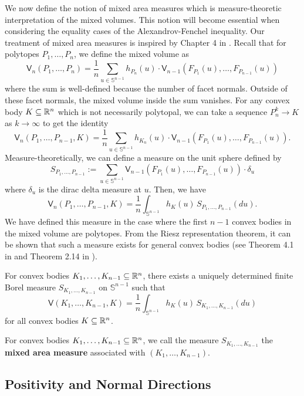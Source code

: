\documentclass{puthesis-UG}
\begin{document}
We now define the notion of mixed area measures which is measure-theoretic interpretation of the mixed volumes. This notion will become essential when considering the equality cases of the Alexandrov-Fenchel inequality. Our treatment of mixed area measures is inspired by Chapter 4 in \cite{Hug2020-ue}. Recall that for polytopes $P_1, \ldots, P_n$, we define the mixed volume as 
\[
	\mathsf{V}_n (P_1, \ldots, P_n) = \frac{1}{n} \sum_{u \in \mathbb{S}^{n-1}} h_{P_n}(u) \cdot \mathsf{V}_{n-1}(F_{P_1}(u), \ldots, F_{P_{n-1}}(u))
\]
where the sum is well-defined because the number of facet normals. Outside of these facet normals, the mixed volume inside the sum vanishes. For any convex body $K \subseteq \mathbb{R}^n$ which is not necessarily polytopal, we can take a sequence $P_n^k \to K$ as $k \to \infty$ to get the identity
\[
	\mathsf{V}_n(P_1, \ldots, P_{n-1}, K) = \frac{1}{n} \sum_{u \in \mathbb{S}^{n-1}} h_{K_n}(u) \cdot \mathsf{V}_{n-1}(F_{P_1}(u), \ldots, F_{P_{n-1}}(u)).
\]
Measure-theoretically, we can define a measure on the unit sphere defined by
\[
	S_{P_1, \ldots, P_{n-1}} := \sum_{u \in \mathbb{S}^{n-1}} \mathsf{V}_{n-1}(F_{P_1}(u), \ldots, F_{P_{n-1}}(u)) \cdot \delta_u
\]
where $\delta_u$ is the dirac delta measure at $u$. Then, we have 
\[
	\mathsf{V}_n(P_1, \ldots, P_{n-1}, K) = \frac{1}{n} \int_{\mathbb{S}^{n-1}} h_{K}(u) \, S_{P_1, \ldots, P_{n-1}}(du).
\]
We have defined this measure in the case where the first $n-1$ convex bodies in the mixed volume are polytopes. From the Riesz representation theorem, it can be shown that such a measure exists for general convex bodies (see Theorem 4.1 in \cite{Hug2020-ue} and Theorem 2.14 in \cite{rudin}).

\begin{thm} 
	For convex bodies $K_1, \ldots, K_{n-1} \subseteq \mathbb{R}^n$, there exists a uniquely determined finite Borel measure $S_{K_1, \ldots, K_{n-1}}$ on $\mathbb{S}^{n-1}$ such that 
	\[
		\mathsf{V}(K_1, \ldots, K_{n-1}, K) = \frac{1}{n} \int_{\mathbb{S}^{n-1}} h_K(u) \, S_{K_1, \ldots, K_{n-1}} (du)
	\]
	for all convex bodies $K \subseteq \mathbb{R}^n$. 
\end{thm}

\begin{defn}
	For convex bodies $K_1, \ldots, K_{n-1} \subseteq \mathbb{R}^n$, we call the measure $S_{K_1, \ldots, K_{n-1}}$ the \textbf{mixed area measure} associated with $(K_1, \ldots, K_{n-1})$. 
\end{defn}

\subsection{Positivity and Normal Directions}
\end{document}
